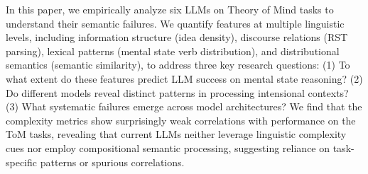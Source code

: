 \documentclass[11pt,a4paper]{article}
\begin{document}
In this paper, we empirically analyze six LLMs on Theory of Mind tasks to understand their semantic failures. We quantify features at multiple linguistic levels, including information structure (idea density), discourse relations (RST parsing), lexical patterns (mental state verb distribution), and distributional semantics (semantic similarity), to address three key research questions: (1) To what extent do these features predict LLM success on mental state reasoning? (2) Do different models reveal distinct patterns in processing intensional contexts? (3) What systematic failures emerge across model architectures? We find that the complexity metrics show surprisingly weak correlations with performance on the ToM tasks, revealing that current LLMs neither leverage linguistic complexity cues nor employ compositional semantic processing, suggesting reliance on task-specific patterns or spurious correlations.


\end{document}
